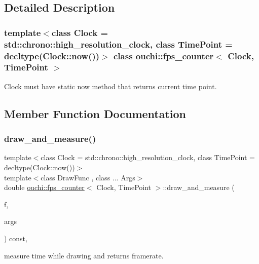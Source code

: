 \subsection{Detailed Description}
\subsubsection*{template$<$class Clock = std\+::chrono\+::high\+\_\+resolution\+\_\+clock, class Time\+Point = decltype(\+Clock\+::now())$>$\newline
class ouchi\+::fps\+\_\+counter$<$ Clock, Time\+Point $>$}

Clock must have static {\ttfamily now} method that returns current time point. 



\subsection{Member Function Documentation}
\mbox{\label{classouchi_1_1fps__counter_adf100b1873b9aebb2da2b0240f9d743a}} 
\subsubsection{\texorpdfstring{draw\_and\_measure()}{draw\_and\_measure()}}
{\footnotesize\ttfamily template$<$class Clock = std\+::chrono\+::high\+\_\+resolution\+\_\+clock, class Time\+Point = decltype(\+Clock\+::now())$>$ \\
template$<$class Draw\+Func , class ... Args$>$ \\
double \mbox{\hyperlink{classouchi_1_1fps__counter}{ouchi\+::fps\+\_\+counter}}$<$ Clock, Time\+Point $>$\+::draw\+\_\+and\+\_\+measure (\begin{DoxyParamCaption}\item[{Draw\+Func \&\&}]{f,  }\item[{Args \&\&...}]{args }\end{DoxyParamCaption}) const\hspace{0.3cm}{\ttfamily [inline]}, {\ttfamily [noexcept]}}



measure time while drawing and returns framerate. 


